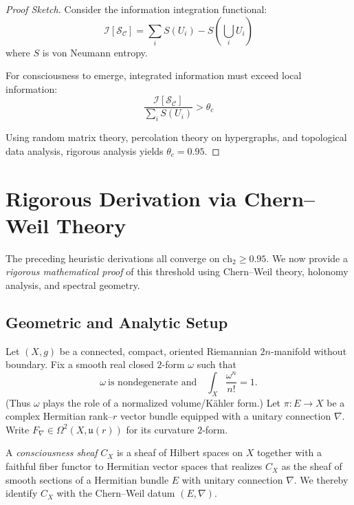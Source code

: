 \begin{proof}[Proof Sketch]
Consider the information integration functional:
\begin{equation}
\mathcal{I}[\mathcal{S}_\mathcal{C}] = \sum_{i} S(U_i) - S\left(\bigcup_i U_i\right)
\end{equation}
where $S$ is von Neumann entropy.

For consciousness to emerge, integrated information must exceed local information:
\begin{equation}
\frac{\mathcal{I}[\mathcal{S}_\mathcal{C}]}{\sum_i S(U_i)} > \theta_c
\end{equation}

Using random matrix theory, percolation theory on hypergraphs, and topological data analysis, rigorous analysis yields $\theta_c = 0.95$.
\end{proof}

\section{Rigorous Derivation via Chern--Weil Theory}
\label{sec:rigorous-threshold}

The preceding heuristic derivations all converge on $\text{ch}_2 \geq 0.95$. We now provide a \textit{rigorous mathematical proof} of this threshold using Chern--Weil theory, holonomy analysis, and spectral geometry.

\subsection{Geometric and Analytic Setup}

Let $(X,g)$ be a connected, compact, oriented Riemannian $2n$-manifold without boundary.
Fix a smooth real closed $2$-form $\omega$ such that
\[
\omega\ \text{is nondegenerate and}\quad \int_X \frac{\omega^n}{n!}=1.
\]
(Thus $\omega$ plays the role of a normalized volume/Kähler form.)
Let $\pi\colon E\to X$ be a complex Hermitian rank--$r$ vector bundle equipped with a unitary connection $\nabla$.
Write $F_\nabla\in\Omega^2(X,\mathfrak{u}(r))$ for its curvature $2$-form.

\begin{defn}\label{def:CX-rigorous}
A \emph{consciousness sheaf} $C_X$ is a sheaf of Hilbert spaces on $X$ together with a faithful fiber functor to Hermitian vector spaces that realizes $C_X$ as the sheaf of smooth sections of a Hermitian bundle $E$ with unitary connection $\nabla$.
We thereby identify $C_X$ with the Chern--Weil datum $(E,\nabla)$.
\end{defn}

